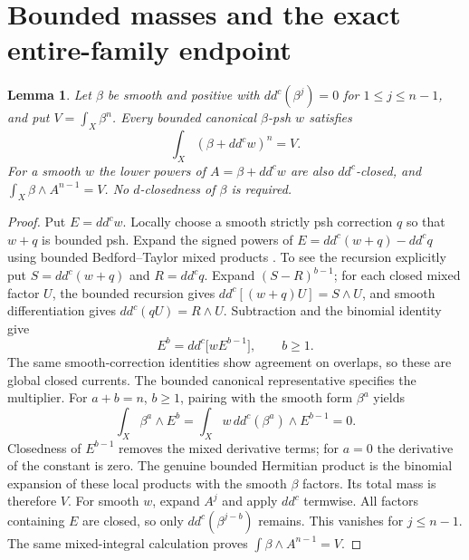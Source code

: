 \documentclass[11pt]{article}
\newcommand{\ddc}{dd^c}
\newtheorem{lemma}[theorem]{Lemma}
\theoremstyle{remark}\newtheorem{remark}[theorem]{Remark}
\begin{document}
\section{Bounded masses and the exact entire-family endpoint}
\begin{lemma}\label{lem:mass}
Let $\beta$ be smooth and positive with
$\ddc(\beta^j)=0$ for $1\leq j\leq n-1$, and put
$V=\int_X\beta^n$. Every bounded canonical $\beta$-psh $w$ satisfies
\[
 \int_X(\beta+\ddc w)^n=V.
\]
For a smooth $w$ the lower powers of $A=\beta+\ddc w$ are also
$dd^c$-closed, and $\int_X\beta\wedge A^{n-1}=V$.
No $d$-closedness of $\beta$ is required.
\end{lemma}
\begin{proof}
Put $E=\ddc w$. Locally choose a smooth strictly psh correction $q$
so that $w+q$ is bounded psh. Expand the signed powers of
$E=\ddc(w+q)-\ddc q$ using bounded Bedford--Taylor mixed products
\cite[equation (2.1), Theorem 2.1 and Corollary 2.2]{BT}.
To see the recursion explicitly put $S=\ddc(w+q)$ and $R=\ddc q$.
Expand $(S-R)^{b-1}$; for each closed mixed factor $U$,
the bounded recursion gives $\ddc[(w+q)U]=S\wedge U$, and smooth
differentiation gives $\ddc(qU)=R\wedge U$. Subtraction and the
binomial identity give
\[
 E^b=\ddc\bigl[w E^{b-1}\bigr],\qquad b\geq1.
\]
The same smooth-correction identities show agreement on overlaps,
so these are global closed currents. The bounded canonical
representative specifies the multiplier.
For $a+b=n$, $b\geq1$, pairing with the smooth form $\beta^a$ yields
\[
 \int_X\beta^a\wedge E^b
   =\int_Xw\,\ddc(\beta^a)\wedge E^{b-1}=0.
\]
Closedness of $E^{b-1}$ removes the mixed derivative terms; for $a=0$
the derivative of the constant is zero. The genuine bounded Hermitian
product is the binomial expansion of these local products with the
smooth $\beta$ factors. Its total mass is therefore $V$.
For smooth $w$, expand $A^j$ and apply $dd^c$ termwise. All factors
containing $E$ are closed, so only $\ddc(\beta^{j-b})$ remains.
This vanishes for $j\leq n-1$. The same mixed-integral calculation
proves $\int\beta\wedge A^{n-1}=V$.
\end{proof}
\end{document}
